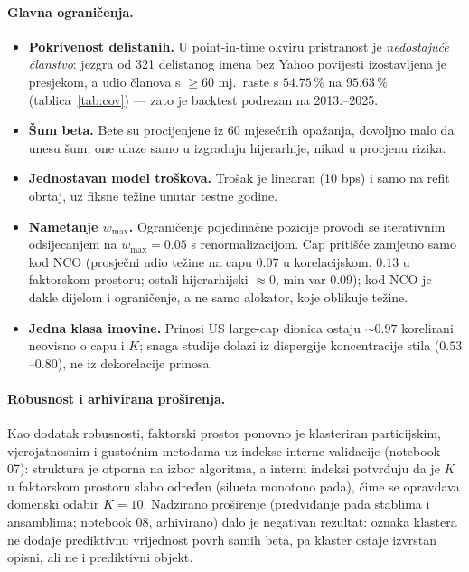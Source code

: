 \documentclass[11pt]{article}
\begin{document}
\paragraph{Glavna ograničenja.}
\begin{itemize}
  \item \textbf{Pokrivenost delistanih.} U point-in-time okviru pristranost je
        \emph{nedostajuće članstvo}: jezgra od 321 delistanog imena bez Yahoo
        povijesti izostavljena je presjekom, a udio članova s $\ge 60$ mj.\ raste
        s $54.75\,\%$ na $95.63\,\%$ (tablica~\ref{tab:cov}) --- zato je backtest
        podrezan na 2013.--2025.
  \item \textbf{Šum beta.} Bete su procijenjene iz 60 mjesečnih opažanja,
        dovoljno malo da unesu šum; one ulaze samo u izgradnju hijerarhije, nikad
        u procjenu rizika.
  \item \textbf{Jednostavan model troškova.} Trošak je linearan (10 bps) i samo
        na refit obrtaj, uz fiksne težine unutar testne godine.
  \item \textbf{Nametanje $w_{\max}$.} Ograničenje pojedinačne pozicije
        provodi se iterativnim odsijecanjem na $w_{\max}=0.05$ s renormalizacijom.
        Cap pritišće zamjetno samo kod NCO (prosječni udio težine na capu $0.07$
        u korelacijskom, $0.13$ u faktorskom prostoru; ostali hijerarhijski
        $\approx 0$, min-var $0.09$); kod NCO je dakle dijelom i ograničenje, a ne
        samo alokator, koje oblikuje težine.
  \item \textbf{Jedna klasa imovine.} Prinosi US large-cap dionica ostaju
        $\sim 0.97$ korelirani neovisno o capu i $K$; snaga studije dolazi iz
        dispergije koncentracije stila ($0.53$--$0.80$), ne iz dekorelacije
        prinosa.
\end{itemize}

\paragraph{Robusnost i arhivirana proširenja.} Kao dodatak robusnosti, faktorski
prostor ponovno je klasteriran particijskim, vjerojatnosnim i gustoćnim metodama
uz indekse interne validacije (notebook 07): struktura je otporna na izbor
algoritma, a interni indeksi potvrđuju da je $K$ u faktorskom prostoru slabo
određen (silueta monotono pada), čime se opravdava domenski odabir $K=10$.
Nadzirano proširenje (predviđanje pada stablima i ansamblima; notebook 08,
arhivirano) dalo je negativan rezultat: oznaka klastera ne dodaje prediktivnu
vrijednost povrh samih beta, pa klaster ostaje izvrstan opisni, ali ne i
prediktivni objekt.
\end{document}
